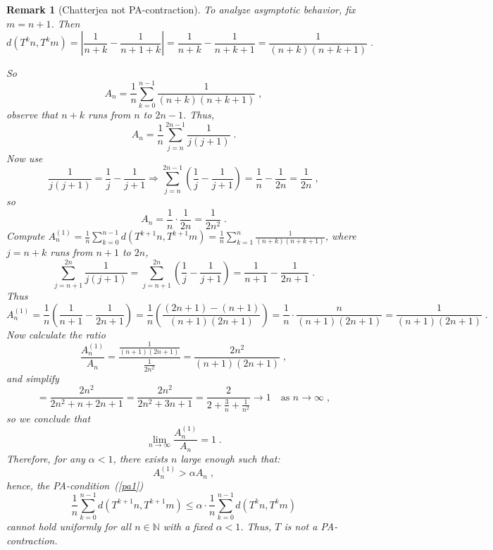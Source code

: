 \documentclass[11pt]{article}
\newtheorem{remark}[theorem]{Remark}
\begin{document}
\begin{remark}[Chatterjea not PA-contraction]
To analyze asymptotic behavior, fix $ m = n + 1 $. Then
\begin{equation}
d(T^k n, T^k m) = \left| \frac{1}{n+k} - \frac{1}{n+1+k} \right| = \frac{1}{n+k} - \frac{1}{n+k+1} = \frac{1}{(n+k)(n+k+1)} \; .
\end{equation}

So
\begin{equation}
A_n = \frac{1}{n} \sum_{k=0}^{n-1} \frac{1}{(n+k)(n+k+1)} \; ,
\end{equation}
observe that $ n+k $ runs from $ n $ to $ 2n-1 $. Thus,
\begin{equation}
A_n = \frac{1}{n} \sum_{j=n}^{2n-1} \frac{1}{j(j+1)} \; .
\end{equation}
Now use
\begin{equation}
\frac{1}{j(j+1)} = \frac{1}{j} - \frac{1}{j+1}
\Rightarrow \sum_{j=n}^{2n-1} \left( \frac{1}{j} - \frac{1}{j+1} \right) = \frac{1}{n} - \frac{1}{2n} = \frac{1}{2n} \;,
\end{equation}
so
\begin{equation}
A_n = \frac{1}{n} \cdot \frac{1}{2n} = \frac{1}{2n^2} \; .
\end{equation}
Compute $ A_n^{(1)} = \frac{1}{n} \sum_{k=0}^{n-1} d(T^{k+1}n, T^{k+1}m) = \frac{1}{n} \sum_{k=1}^{n} \frac{1}{(n+k)(n+k+1)} $, where
$ j = n+k $ runs from $ n+1 $ to $ 2n $, 
\begin{equation}
\sum_{j=n+1}^{2n} \frac{1}{j(j+1)} = \sum_{j=n+1}^{2n} \left( \frac{1}{j} - \frac{1}{j+1} \right) = \frac{1}{n+1} - \frac{1}{2n+1} \; .
\end{equation}
Thus
\begin{equation}
A_n^{(1)} = \frac{1}{n} \left( \frac{1}{n+1} - \frac{1}{2n+1} \right)
= \frac{1}{n} \left( \frac{(2n+1) - (n+1)}{(n+1)(2n+1)} \right)
= \frac{1}{n} \cdot \frac{n}{(n+1)(2n+1)}
= \frac{1}{(n+1)(2n+1)} \; .
\end{equation}
Now calculate the ratio
\begin{equation}
\frac{A_n^{(1)}}{A_n} = \frac{ \frac{1}{(n+1)(2n+1)} }{ \frac{1}{2n^2} } = \frac{2n^2}{(n+1)(2n+1)} \; ,
\end{equation}
and simplify
\begin{equation}
= \frac{2n^2}{2n^2 + n + 2n + 1} = \frac{2n^2}{2n^2 + 3n + 1}
= \frac{2}{2 + \frac{3}{n} + \frac{1}{n^2}} \to 1 \quad \text{as } n \to \infty \; ,
\end{equation}
so we conclude that
\begin{equation}
\lim_{n \to \infty} \frac{A_n^{(1)}}{A_n} = 1 \; .
\end{equation}
Therefore, for any $ \alpha < 1 $, there exists $ n $ large enough such that:
\begin{equation}
A_n^{(1)} > \alpha A_n \; ,
\end{equation}
hence, the PA-condition~(\ref{pa1})
\begin{equation}
\frac{1}{n} \sum_{k=0}^{n-1} d(T^{k+1}n, T^{k+1}m) \leq \alpha \cdot \frac{1}{n} \sum_{k=0}^{n-1} d(T^k n, T^k m)
\end{equation}
cannot hold uniformly for all $ n \in \mathbb{N} $ with a fixed $ \alpha < 1 $.
Thus, $T$ is not a PA-contraction.



\end{remark}
\end{document}
